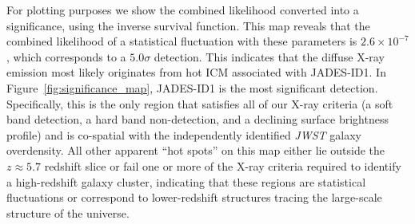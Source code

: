 \documentclass[pdflatex,sn-mathphys-num]{sn-jnl}
\theoremstyle{thmstyleone}
\theoremstyle{thmstyletwo}
\theoremstyle{thmstylethree}
\begin{document}
For plotting purposes we show the combined likelihood converted into a significance, using the inverse survival function. This map reveals that the combined likelihood of a statistical fluctuation with these parameters is $2.6\times10^{-7}$, which corresponds to a $5.0\sigma$ detection. This indicates that the diffuse X-ray emission most likely originates from hot ICM associated with JADES-ID1. In Figure~\ref{fig:significance_map}, JADES-ID1 is the most significant detection. Specifically, this is the only region that satisfies all of our X-ray criteria (a soft band detection, a hard band non-detection, and a declining surface brightness profile) and is co-spatial with the independently identified \textit{JWST} galaxy overdensity. All other apparent ``hot spots'' on this map either lie outside the $z\approx5.7$ redshift slice or fail one or more of the X-ray criteria required to identify a high-redshift galaxy cluster, indicating that these regions are statistical fluctuations or correspond to lower-redshift structures tracing the large-scale structure of the universe.



























\end{document}
